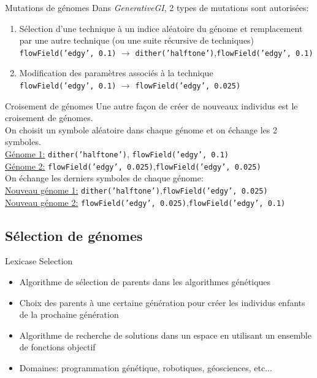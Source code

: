 \documentclass[aspectratio=169]{beamer}
\begin{document}
\begin{frame}{Mutations de génomes}
    Dans \textit{GenerativeGI}, 2 types de mutations sont autorisées:
    \begin{enumerate}
        \item Sélection d'une technique à un indice aléatoire du génome et remplacement par une autre technique (ou une suite récursive de techniques) \\
        \texttt{flowField('edgy', 0.1)} $\rightarrow$ \texttt{dither('halftone')},\texttt{flowField('edgy', 0.1)}
        \item Modification des paramètres associés à la technique \\
        \texttt{flowField('edgy', 0.1)} $\rightarrow$ \texttt{flowField('edgy', 0.025)}
    \end{enumerate}    
\end{frame}

\begin{frame}{Croisement de génomes}
    Une autre façon de créer de nouveaux individus est le croisement de génomes. \\
    On choisit un symbole aléatoire dans chaque génome et on échange les 2 symboles.\\
    \underline{Génome 1:} \texttt{dither('halftone')},\color{red} \texttt{flowField('edgy', 0.1)} \color{black}\\
    \underline{Génome 2:} \texttt{flowField('edgy', 0.025)},\color{red}\texttt{flowField('edgy', 0.025)} \color{black}\\
    On échange les derniers symboles de chaque génome:\\
    \underline{Nouveau génome 1:} \texttt{dither('halftone')},\color{red}\texttt{flowField('edgy', 0.025)} \color{black} \\
    \underline{Nouveau génome 2:} \texttt{flowField('edgy', 0.025)},\color{red}\texttt{flowField('edgy', 0.1)} \color{black} \\
\end{frame}

\subsection{Sélection de génomes}

\begin{frame}{Lexicase Selection}
    \begin{itemize}
        \item Algorithme de sélection de parents dans les algorithmes génétiques
        \item Choix des parents à une certaine génération pour créer les individus enfants de la prochaine génération 
        \item Algorithme de recherche de solutions dans un espace en utilisant un ensemble de fonctions objectif 
        \item Domaines: programmation génétique, robotiques, géosciences, etc... 
    \end{itemize}
\end{frame}
\end{document}
